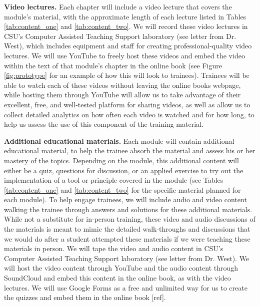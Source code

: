 \documentclass[pdftex,english,11pt,parskip=half]{scrartcl}
\begin{document}
\textbf{Video lectures.} Each chapter will include a video lecture that covers
the module's material, with the approximate length of each lecture listed in
Tables \ref{tab:content_one} and \ref{tab:content_two}. We will record these
video lectures in CSU's Computer Assisted Teaching Support laboratory (see
letter from Dr. West), which includes equipment and staff for creating
professional-quality video lectures. We will use YouTube to freely host these
videos and embed the video within the text of that module's chapter in the
online book (see Figure \ref{fig:prototype} for an example of how this will look
to trainees). Trainees will be able to watch each of these videos without
leaving the online books webpage, while hosting them through YouTube will allow
us to take advantage of their excellent, free, and well-tested platform for
sharing videos, as well as allow us to collect detailed analytics on how often
each video is watched and for how long, to help us assess the use of this
component of the training material. 

\textbf{Additional educational materials.} Each module will contain additional
educational material, to help the trainee absorb the material and assess his or
her mastery of the topics. Depending on the module, this additional content will
either be a quiz, questions for discussion, or an applied exercise to try out
the implementation of a tool or principle covered in the module (see Tables
\ref{tab:content_one} and \ref{tab:content_two} for the specific material
planned for each module). To help engage trainees, we will include audio and
video content walking the trainee through answers and solutions for these
additional materials. While not a substitute for in-person training, these video
and audio discussions of the materials is meant to mimic the detailed
walk-throughs and discussions that we would do after a student attempted these
materials if we were teaching these materials in person. We will tape the video
and audio content in CSU's Computer Assisted Teaching Support laboratory (see
letter from Dr. West). We will host the video content through YouTube and the
audio content through SoundCloud and embed this content in the online book, as
with the video lectures. We will use Google Forms as a free and unlimited way
for us to create the quizzes and embed them in the online book [ref].
\end{document}
